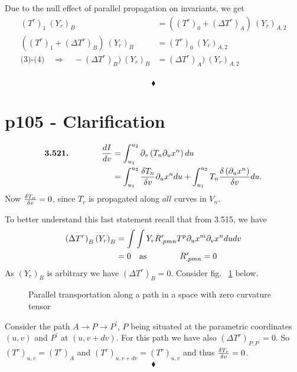 Due to the null effect of  parallel propagation on invariants, we  get
\begin{align}
 (T^r)_1\ (Y_r)_{B} &= ((T^r)_0+ (\Delta T^r)_{A})\ (Y_r)_{A,2}\\
 ((T^r)_1+(\Delta T^r)_B )\ (Y_r)_{B}&=(T^r)_0 \ (Y_r)_{A,2}\\
 \text{(3)-(4)}\quad \Rightarrow \quad -(\Delta T^r)_B )\ (Y_r)_{B}&=(\Delta T^r)_{A})\ (Y_r)_{A,2}
\end{align}\\
$$\blacklozenge$$
\newpage


\section{p105 - Clarification}
\begin{tcolorbox}
\begin{align*}
\textbf{3.521.} \spatie \dv{I}{v} &= \int_{u_1}^{u_2}\partial_v\left(T_n\partial_u x^n\right)du\\
&= \int_{u_1}^{u_2}\fdv{T_n}{v}\partial_u x^n du + \int_{u_1}^{u_2}T_n\fdv{\left(\partial_u x^n\right)}{v} du. 
\end{align*}
Now $\fdv{T_n}{v}=0$, since $T_r$ is propagated along $\textit{all}$ curves in $V_n$.
\end{tcolorbox}
To better understand this last statement recall that from 3.515, we have
\begin{align*}
 \left( \Delta T^r \right)_B \left( Y_r \right)_B &= \int \int Y_rR^r_{.pmn}T^p\partial _u x^m \partial _v x^n du dv\\
 &= 0 \quad \text{as} \quad\quad\quad\quad R^r_{.pmn}=0
\end{align*}
As $\left( Y_r \right)_B$ is arbitrary we have $\left( \Delta T^r \right)_B =0$. Consider fig. ~\ref{fig:fig_p105_3521_a} below.\\
\begin{figure}[H]
\center

\caption{Parallel transportation along a path in a space with zero curvature tensor}
\label{fig:fig_p105_3521_a}
\end{figure}
Consider the path $A\rightarrow P \rightarrow P^{'}$, $ P$ being situated at the parametric coordinates $(u, v)$ and $P^{'}$ at $(u, v + dv)$. For this path we have also $\left( \Delta T^r \right)_{P,P^{'}} =0$. So $(T^r)_{u,v} = (T^r)_A$ and $(T^r)_{u,v+dv} = (T^r)_{u,v}$ and thus $\fdv{T_r}{v}=0$.
$$\blacklozenge$$
\newpage

